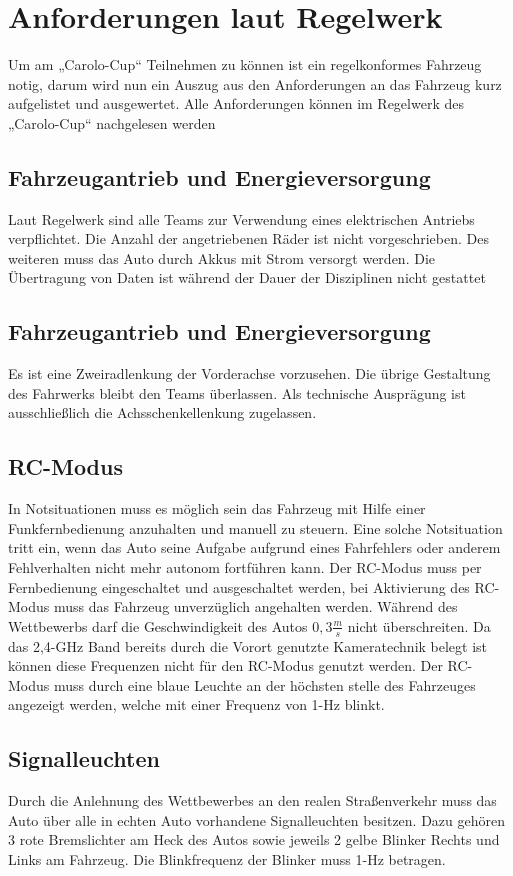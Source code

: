 \section{Anforderungen laut Regelwerk}
Um am „Carolo-Cup“ Teilnehmen zu können ist ein regelkonformes Fahrzeug notig, darum wird nun ein Auszug aus den Anforderungen an das Fahrzeug kurz 
aufgelistet und ausgewertet.
Alle Anforderungen können im Regelwerk des „Carolo-Cup“ nachgelesen werden \cite{website-carolo-cup-regelwerk}


\subsection{Fahrzeugantrieb und Energieversorgung}
Laut Regelwerk sind alle Teams zur Verwendung eines elektrischen Antriebs verpflichtet.
Die Anzahl der angetriebenen Räder ist nicht vorgeschrieben.
Des weiteren muss das Auto durch Akkus mit Strom versorgt werden.
Die Übertragung von Daten ist während der Dauer der Disziplinen nicht gestattet

\subsection{Fahrzeugantrieb und Energieversorgung}
Es ist eine Zweiradlenkung der Vorderachse vorzusehen. Die übrige Gestaltung des Fahrwerks bleibt den Teams überlassen. Als
technische Ausprägung ist ausschließlich die Achsschenkellenkung zugelassen.

\subsection{RC-Modus}
In Notsituationen muss es möglich sein das Fahrzeug mit Hilfe einer Funkfernbedienung anzuhalten und manuell zu steuern. Eine solche Notsituation tritt ein, wenn
das Auto seine Aufgabe aufgrund eines Fahrfehlers oder anderem Fehlverhalten nicht mehr autonom fortführen kann.
Der RC-Modus muss per Fernbedienung eingeschaltet und ausgeschaltet werden, bei Aktivierung des RC-Modus muss das Fahrzeug unverzüglich angehalten werden.
Während des Wettbewerbs darf die Geschwindigkeit des Autos $0,3\frac{m}{s}$ nicht überschreiten.
Da das 2,4-GHz Band bereits durch die Vorort genutzte Kameratechnik belegt ist können diese Frequenzen nicht für den RC-Modus genutzt werden.
Der RC-Modus muss durch eine blaue Leuchte an der höchsten stelle des Fahrzeuges angezeigt werden, welche mit einer Frequenz von 1-Hz blinkt.

\subsection{Signalleuchten}
Durch die Anlehnung des Wettbewerbes an den realen Straßenverkehr muss das Auto über alle in echten Auto vorhandene Signalleuchten besitzen. 
Dazu gehören 3 rote Bremslichter am Heck des Autos sowie jeweils 2 gelbe Blinker Rechts und Links am Fahrzeug.  Die Blinkfrequenz der Blinker muss
1-Hz betragen.

